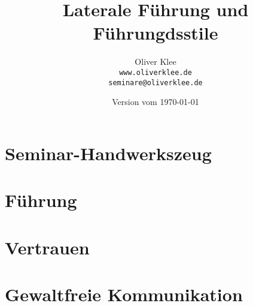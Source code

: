 \documentclass[a4paper,openany,twoside,titlepage,10pt,headsepline]{scrbook}
\title{Laterale Führung und Führungdsstile}
\author{Oliver Klee\\\texttt{www.oliverklee.de}\\\texttt{seminare@oliverklee.de}}
\date{Version vom \today}
\begin{document}
\frontmatter

\maketitle

\tableofcontents


\mainmatter

\chapter{Seminar-Handwerkszeug}





\chapter{Führung}












\chapter{Vertrauen}



\chapter{Gewaltfreie Kommunikation}




\backmatter





\printindex
\end{document}
